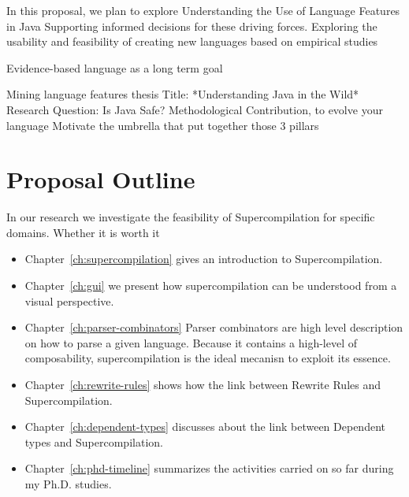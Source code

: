 In this proposal, we plan to explore 
Understanding the Use of Language Features in Java
Supporting informed decisions for these driving forces.
Exploring the usability and feasibility of creating new languages based on empirical studies



Evidence-based language as a long term goal

Mining language features thesis
Title: *Understanding Java in the Wild*
Research Question: Is Java Safe?
Methodological Contribution, to evolve your language
Motivate the umbrella that put together those 3 pillars





\section{Proposal Outline}

In our research we investigate the feasibility of Supercompilation for specific domains.
Whether it is worth it

\begin{itemize}

\item Chapter~\ref{ch:supercompilation} gives an introduction to Supercompilation.

\item Chapter~\ref{ch:gui} we present how supercompilation can be understood from a visual perspective.

\item Chapter~\ref{ch:parser-combinators} Parser combinators are high level description on how to parse a given language.
Because it contains a high-level of composability, supercompilation is the ideal mecanisn to exploit its essence.

\item Chapter~\ref{ch:rewrite-rules} shows how the link between Rewrite Rules and Supercompilation.

\item Chapter~\ref{ch:dependent-types} discusses about the link between Dependent types and Supercompilation.

\item Chapter~\ref{ch:phd-timeline} summarizes the activities carried on so far during my Ph.D. studies.

\end{itemize}



